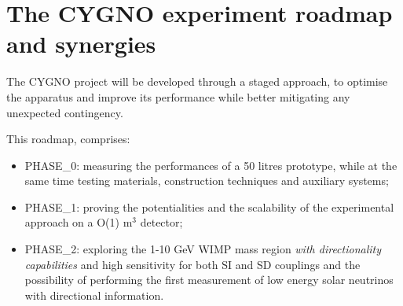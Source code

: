\documentclass[physics,article,submit,moreauthors,pdftex]{Definitions/mdpi}
\begin{document}



\section{The CYGNO experiment roadmap and synergies}
The CYGNO project will be developed through a staged approach, to optimise the apparatus and improve its performance while better mitigating any unexpected contingency. 



This roadmap, comprises:


\begin{itemize}
    \item PHASE\_0: measuring the performances of a 50 litres prototype, while at the same time testing materials, construction techniques and auxiliary systems;
    \item PHASE\_1: proving the potentialities and the scalability of the experimental approach 
    on a O(1) m$^3$ detector;
    \item PHASE\_2: exploring the 1-10 GeV WIMP mass region \emph{with directionality capabilities} and high sensitivity for both SI and SD couplings and the possibility of performing the first measurement of low energy solar neutrinos with directional information. 
\end{itemize}
\end{document}
